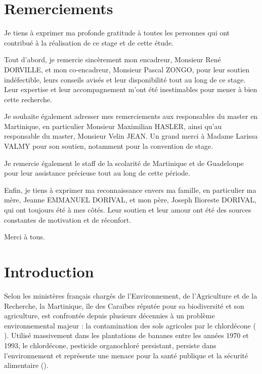 \documentclass{report}
\begin{document}
\chapter*{Remerciements}

Je tiens à exprimer ma profonde gratitude à toutes les personnes qui ont contribué à la réalisation de ce stage et de cette étude.

Tout d'abord, je remercie sincèrement mon encadreur, Monsieur René DORVILLE, et mon co-encadreur, Monsieur Pascal ZONGO, pour leur soutien indéfectible, leurs conseils avisés et leur disponibilité tout au long de ce stage. Leur expertise et leur accompagnement m'ont été inestimables pour mener à bien cette recherche.

Je souhaite également adresser mes remerciements aux responsables du master en Martinique, en particulier Monsieur Maximilian HASLER, ainsi qu'au responsable du master, Monsieur Velin JEAN. Un grand merci à Madame Larissa VALMY pour son soutien, notamment pour la convention de stage.

Je remercie également le staff de la scolarité de Martinique et de Guadeloupe pour leur assistance précieuse tout au long de cette période.

Enfin, je tiens à exprimer ma reconnaissance envers ma famille, en particulier ma mère, Jeanne EMMANUEL DORIVAL, et mon père, Joseph Ilioreste DORIVAL, qui ont toujours été à mes côtés. Leur soutien et leur amour ont été des sources constantes de motivation et de réconfort.

Merci à tous.

\tableofcontents
\newpage

\chapter*{Introduction}

Selon les ministères français chargés de l’Environnement, de l’Agriculture et de la
Recherche, la Martinique, île des Caraïbes réputée pour sa biodiversité et son agriculture, est confrontée depuis plusieurs décennies à un problème environnemental majeur : la contamination des sols agricoles par le chlordécone ( \cite{sanchez2022chlordecone}). Utilisé massivement dans les plantations de bananes entre les années 1970 et 1993, le chlordécone, pesticide organochloré persistant, persiste dans l'environnement et représente une menace pour la santé publique et la sécurité alimentaire (\cite{coulis2023contamination}).\\
\end{document}
